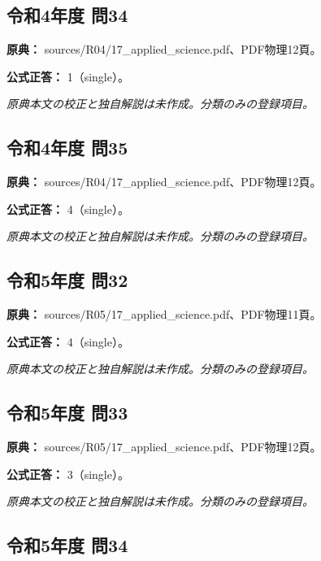 \subsection{令和4年度 問34}
\label{q:r04-reg-applied-34}

\noindent\textbf{原典：} sources/R04/17\_applied\_science.pdf、PDF物理12頁。

\textbf{公式正答：} 1（single）。

\par\textit{原典本文の校正と独自解説は未作成。分類のみの登録項目。}

\subsection{令和4年度 問35}
\label{q:r04-reg-applied-35}

\noindent\textbf{原典：} sources/R04/17\_applied\_science.pdf、PDF物理12頁。

\textbf{公式正答：} 4（single）。

\par\textit{原典本文の校正と独自解説は未作成。分類のみの登録項目。}

\subsection{令和5年度 問32}
\label{q:r05-reg-applied-32}

\noindent\textbf{原典：} sources/R05/17\_applied\_science.pdf、PDF物理11頁。

\textbf{公式正答：} 4（single）。

\par\textit{原典本文の校正と独自解説は未作成。分類のみの登録項目。}

\subsection{令和5年度 問33}
\label{q:r05-reg-applied-33}

\noindent\textbf{原典：} sources/R05/17\_applied\_science.pdf、PDF物理12頁。

\textbf{公式正答：} 3（single）。

\par\textit{原典本文の校正と独自解説は未作成。分類のみの登録項目。}

\subsection{令和5年度 問34}
\label{q:r05-reg-applied-34}

